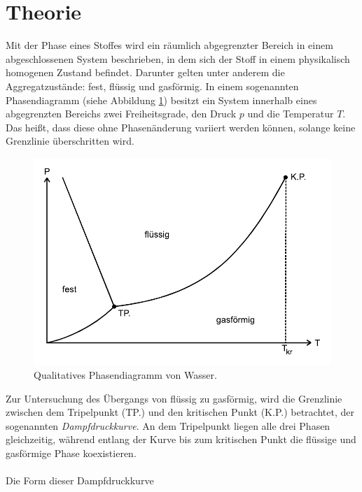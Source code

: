 \section{Theorie}
\label{sec:Theorie}

Mit der Phase eines Stoffes wird ein räumlich abgegrenzter Bereich in einem abgeschlossenen System beschrieben,
in dem sich der Stoff in einem physikalisch homogenen Zustand befindet. 
Darunter gelten unter anderem die Aggregatzustände: fest, flüssig und gasförmig.
In einem sogenannten Phasendiagramm (siehe Abbildung \ref{fig:phasendiagramm}) besitzt ein System
innerhalb eines abgegrenzten Bereichs zwei Freiheitsgrade, den Druck $p$ und die Temperatur $T$.
Das heißt, dass diese ohne Phasenänderung variiert werden können, solange keine Grenzlinie überschritten wird.

\begin{figure} 
    \centering
    \includegraphics[width=12cm] {pictures/phasendiagramm.pdf}  
    \caption{Qualitatives Phasendiagramm von Wasser. \cite[1]{v203}}
    \label{fig:phasendiagramm}
\end{figure}

Zur Untersuchung des Übergangs von flüssig zu gasförmig, wird die Grenzlinie zwischen dem
Tripelpunkt (TP.) und den kritischen Punkt (K.P.) betrachtet, der sogenannten \textit{Dampfdruckkurve}.
An dem Tripelpunkt liegen alle drei Phasen gleichzeitig, während entlang der Kurve bis zum
kritischen Punkt die flüssige und gasförmige Phase koexistieren. \\
\\
Die Form dieser Dampfdruckkurve